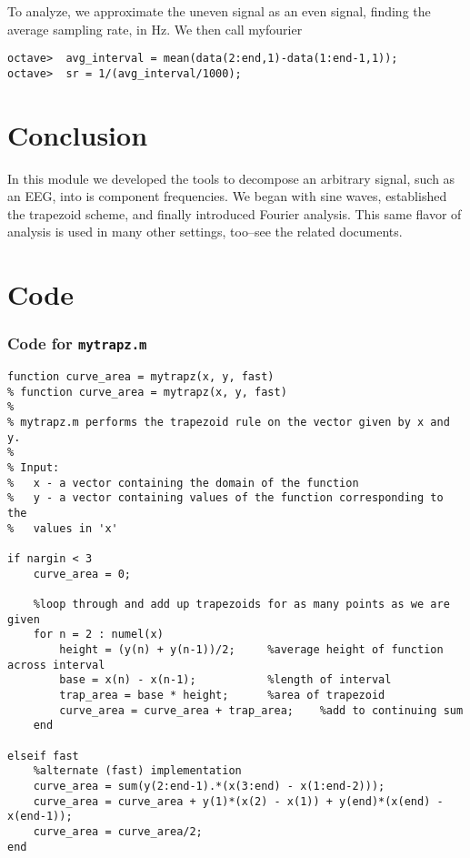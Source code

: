 \documentclass{article}
\begin{document}
To analyze, we approximate the uneven signal as an even signal, finding the average sampling rate, in Hz.  We then call myfourier
\begin{verbatim}
octave>  avg_interval = mean(data(2:end,1)-data(1:end-1,1));
octave>  sr = 1/(avg_interval/1000);

\end{verbatim}

\section{Conclusion}
In this module we developed the tools to decompose an arbitrary signal, such as an EEG, into is component frequencies.  We began with sine waves, established the trapezoid scheme, and finally introduced Fourier analysis.  This same flavor of analysis is used in many other settings, too--see the related documents. 

\section{Code}
\subsubsection* {Code for \tt mytrapz.m}

\begin{verbatim}
function curve_area = mytrapz(x, y, fast)
% function curve_area = mytrapz(x, y, fast)
%
% mytrapz.m performs the trapezoid rule on the vector given by x and y.
%
% Input:
%   x - a vector containing the domain of the function
%   y - a vector containing values of the function corresponding to the
%   values in 'x'

if nargin < 3
    curve_area = 0;
    
    %loop through and add up trapezoids for as many points as we are given
    for n = 2 : numel(x)
        height = (y(n) + y(n-1))/2;     %average height of function across interval
        base = x(n) - x(n-1);           %length of interval
        trap_area = base * height;      %area of trapezoid
        curve_area = curve_area + trap_area;    %add to continuing sum
    end
    
elseif fast
    %alternate (fast) implementation
    curve_area = sum(y(2:end-1).*(x(3:end) - x(1:end-2)));
    curve_area = curve_area + y(1)*(x(2) - x(1)) + y(end)*(x(end) - x(end-1));
    curve_area = curve_area/2;
end
\end{verbatim}
\end{document}
